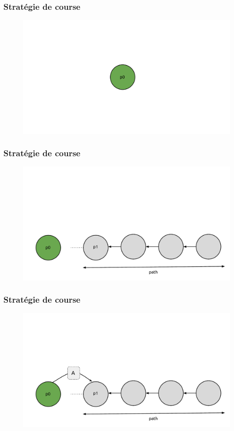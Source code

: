 \documentclass[c]{beamer}
\begin{document}
\begin{frame}[label=strategie1]
\transdissolve[duration=1]
\frametitle{Stratégie de course}
\begin{figure}[!h]
\centering
\includegraphics[scale=0.3]{fig/diag3.pdf}
\end{figure}
\end{frame}

\begin{frame}[label=strategie2]
\transdissolve[duration=1]
\frametitle{Stratégie de course}
\begin{figure}[!h]
\centering
\includegraphics[scale=0.3]{fig/diag4.pdf}
\end{figure}
\end{frame}

\begin{frame}[label=strategie3]
\transdissolve[duration=1]
\frametitle{Stratégie de course}
\begin{figure}[!h]
\centering
\includegraphics[scale=0.3]{fig/diag5.pdf}
\end{figure}
\end{frame}
\end{document}
